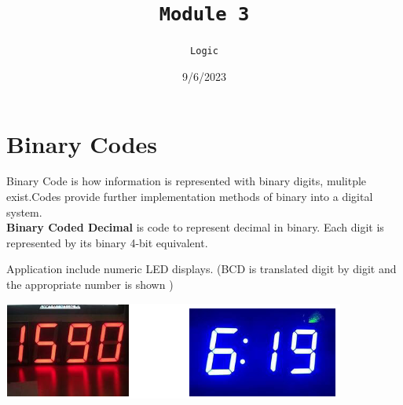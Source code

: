 \documentclass[a4paper,12pt]{article}
\title{\texttt{Module 3}\\\hrulefill}
\author{\texttt{Logic}}
\date{\small{9/6/2023}}
\newenvironment{6mini}{
  \begin{minipage}{6cm}
}{
  \end{minipage}
}
\begin{document}
    \maketitle

    \section{Binary Codes}
        Binary Code is how information is represented with binary digits, mulitple exist.Codes provide further implementation methods of binary into a digital system.\vspace{5pt}\\
        \textbf{Binary Coded Decimal} is code to represent decimal in binary. Each digit is represented by its binary 4-bit equivalent.\\
        \begin{6mini}
            Application include numeric LED displays. (BCD is translated digit by digit and the appropriate number is shown
            )
        \end{6mini}
        \begin{6mini}
            \includegraphics{LED displays.png}
        \end{6mini}
\end{document}
